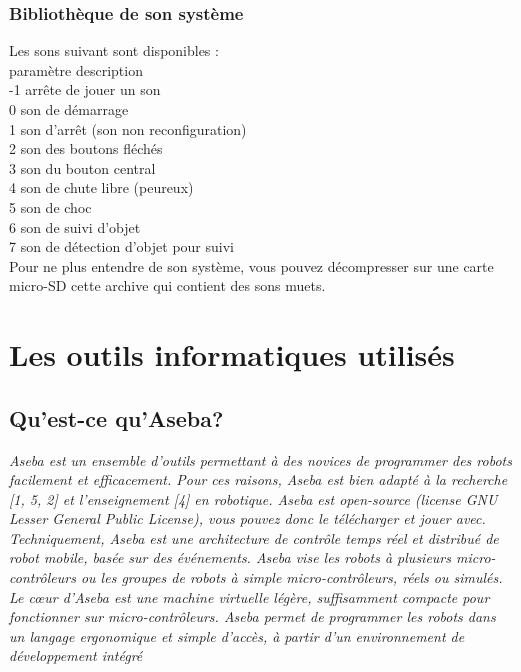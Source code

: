 \documentclass[a4paper, 12pt]{report}
\begin{document}
\subsection{Bibliothèque de son système}
Les sons suivant sont disponibles :\\
paramètre 	description\\
-1 	arrête de jouer un son\\
0 	son de démarrage\\
1 	son d'arrêt (son non reconfiguration)\\
2 	son des boutons fléchés\\
3 	son du bouton central\\
4 	son de chute libre (peureux)\\
5 	son de choc\\
6 	son de suivi d'objet\\
7 	son de détection d'objet pour suivi\\
Pour ne plus entendre de son système, vous pouvez décompresser sur une carte micro-SD cette archive qui contient des sons muets.

\chapter{Les outils informatiques utilisés}
\section{Qu'est-ce qu'Aseba?\cite{thymio2016}}
\textit{Aseba est un ensemble d'outils permettant à des novices de programmer des robots facilement et efficacement. Pour ces raisons, Aseba est bien adapté à la recherche [1, 5, 2] et l'enseignement [4] en robotique. Aseba est open-source (license GNU Lesser General Public License), vous pouvez donc le télécharger et jouer avec.\\
Techniquement, Aseba est une architecture de contrôle temps réel et distribué de robot mobile, basée sur des événements. Aseba vise les robots à plusieurs micro-contrôleurs ou les groupes de robots à simple micro-contrôleurs, réels ou simulés. Le cœur d'Aseba est une machine virtuelle légère, suffisamment compacte pour fonctionner sur micro-contrôleurs. Aseba permet de programmer les robots dans un langage ergonomique et simple d'accès, à partir d'un environnement de développement intégré}
\end{document}
